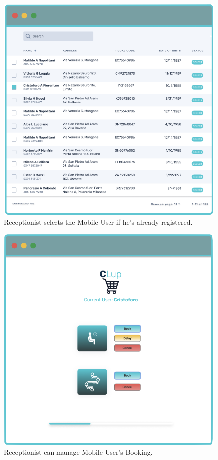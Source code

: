 \begin{figure}[H]
  \caption{Receptionist selects the Mobile User if he's already registered.}
  \label{fig:Login}
  \centering
  \includegraphics[scale=0.35]{images/mockup/Select_User.png}

\end{figure}

\begin{figure}[H]
  \caption{Receptionist can manage Mobile User's Booking.}
  \label{fig:Login}
  \centering
  \includegraphics[scale=0.35]{images/mockup/Home_Rec.png}

\end{figure}



